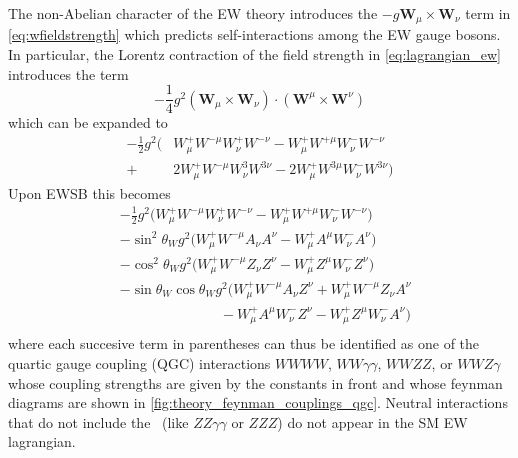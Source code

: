 The non-Abelian character of the 
EW theory introduces the $-g\textbf{W}_{\mu} \times \textbf{W}_{\nu}$
term in \eqref{eq:wfieldstrength}
which predicts self-interactions
among the EW gauge bosons. 
In particular, the Lorentz contraction of the field strength 
in \eqn\eqref{eq:lagrangian_ew}
introduces the term 
\begin{equation}
-\frac{1}{4} g^2 (\textbf{W}_{\mu} \times \textbf{W}_{\nu}) \cdot
                 (\textbf{W}^{\mu} \times \textbf{W}^{\nu}) 
\end{equation}
which can be expanded to 
\begin{equation}
\begin{aligned}
-\frac{1}{2} g^2 \Big( & W_{\mu}^+ W^{-\mu} W_{\nu}^+W^{-\nu}
                  -  W_{\mu}^+ W^{+\mu} W_{\nu}^- W^{-\nu} \\
		  + &2 W_{\mu}^+ W^{-\mu} W^{3}_{\nu}W^{3 \nu}
		  - 2 W_{\mu}^+ W^{3\mu} W_{\nu}^- W^{3 \nu}\Big)
\end{aligned}
\end{equation}
Upon EWSB this becomes
\begin{equation}
\begin{aligned}
&-\frac{1}{2} g^2 \Big(  W_{\mu}^+ W^{-\mu} W_{\nu}^+W^{-\nu}
                  -  W_{\mu}^+ W^{+\mu} W_{\nu}^- W^{-\nu} \Big) \\
&-\sin^2\theta_W g^2 \Big(  W_{\mu}^+ W^{-\mu} A_{\nu} A^{\nu}
                  -  W_{\mu}^+ A^{\mu} W_{\nu}^- A^{\nu} \Big)\\
&-\cos^2\theta_W g^2 \Big( W_{\mu}^+ W^{-\mu} Z_{\nu} Z^{\nu}
                  -  W_{\mu}^+ Z^{\mu} W_{\nu}^- Z^{\nu} \Big)\\
&-\sin\theta_W\cos\theta_W g^2 \Big( W_{\mu}^+ W^{-\mu} A_{\nu} Z^{\nu}
                  +W_{\mu}^+W^{-\mu} Z_{\nu} A^{\nu}\\
		  &\hspace{3cm}- W_{\mu}^+ A^{\mu} W_{\nu}^- Z^{\nu}
		  - W_{\mu}^+ Z^{\mu} W_{\nu}^- A^{\nu}\Big)\\
\end{aligned}
\end{equation}
where each succesive term in parentheses  
can thus be identified as one of the quartic gauge coupling
(QGC) interactions $WWWW$, $WW\gamma\gamma$, $WWZZ$, or $WWZ\gamma$
whose coupling strengths are given by the constants in front and
whose feynman diagrams 
are shown in \fig\ref{fig:theory_feynman_couplings_qgc}.
Neutral interactions that do not 
include the \dubya~(like $ZZ\gamma\gamma$ or $ZZZ$)
do not appear in the SM EW lagrangian.





